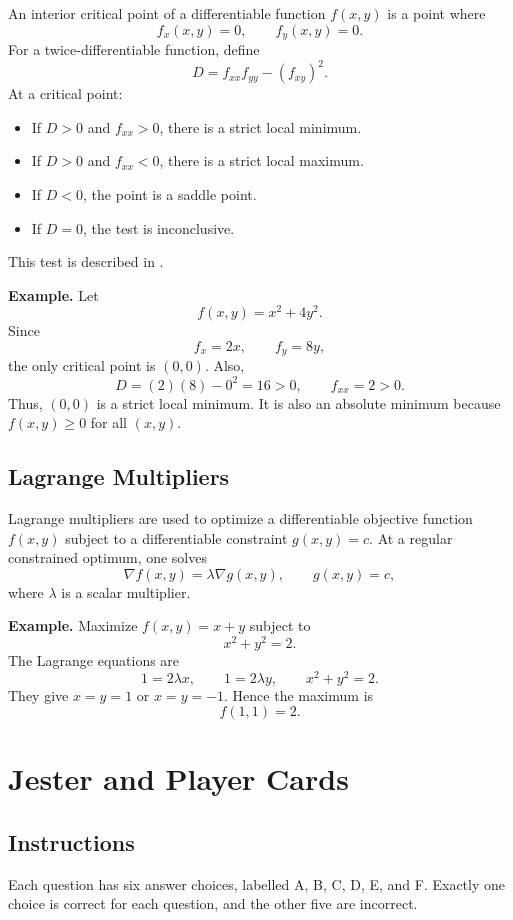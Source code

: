 \documentclass[a4paper,12pt]{article}
\theoremstyle{mystyle}
\numberwithin{equation}{section}
\numberwithin{theorem}{section}
\numberwithin{proposition}{section}
\numberwithin{example}{section}
\numberwithin{remark}{section}
\numberwithin{lemma}{section}
\numberwithin{corollary}{section}
\numberwithin{definition}{section}
\begin{document}
An interior critical point of a differentiable function \(f(x,y)\)
is a point where
\[
f_x(x,y)=0,\qquad f_y(x,y)=0.
\]
For a twice-differentiable function, define
\[
D=f_{xx}f_{yy}-(f_{xy})^{2}.
\]
At a critical point:
\begin{itemize}
    \item If \(D>0\) and \(f_{xx}>0\), there is a strict local minimum.
    \item If \(D>0\) and \(f_{xx}<0\), there is a strict local maximum.
    \item If \(D<0\), the point is a saddle point.
    \item If \(D=0\), the test is inconclusive.
\end{itemize}
This test is described in \cite{openstax2016}.

\textbf{Example.} Let
\[
f(x,y)=x^{2}+4y^{2}.
\]
Since
\[
f_x=2x,\qquad f_y=8y,
\]
the only critical point is \((0,0)\). Also,
\[
D=(2)(8)-0^{2}=16>0,\qquad f_{xx}=2>0.
\]
Thus, \((0,0)\) is a strict local minimum. It is also an absolute
minimum because \(f(x,y)\ge0\) for all \((x,y)\).

\subsection{Lagrange Multipliers}

Lagrange multipliers are used to optimize a differentiable objective
function \(f(x,y)\) subject to a differentiable constraint
\(g(x,y)=c\). At a regular constrained optimum, one solves
\[
\nabla f(x,y)=\lambda\nabla g(x,y),
\qquad g(x,y)=c,
\]
where \(\lambda\) is a scalar multiplier.

\textbf{Example.} Maximize \(f(x,y)=x+y\) subject to
\[
x^{2}+y^{2}=2.
\]
The Lagrange equations are
\[
1=2\lambda x,\qquad 1=2\lambda y,
\qquad x^{2}+y^{2}=2.
\]
They give \(x=y=1\) or \(x=y=-1\). Hence the maximum is
\[
f(1,1)=2.
\]

\section{Jester and Player Cards}
\label{S:3}
\subsection{Instructions}

Each question has six answer choices, labelled
A, B, C, D, E, and F. Exactly one choice is correct
for each question, and the other five are incorrect.
\end{document}
